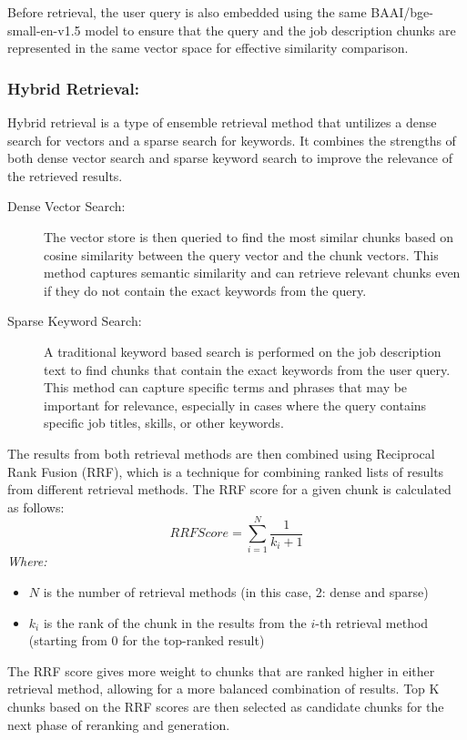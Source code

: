 ﻿\documentclass{article}
\renewcommand{\text}[1]{\mathit{#1}}
\begin{document}
Before retrieval, the user query is also embedded using the same BAAI/bge-small-en-v1.5 model to ensure that the query and the job description chunks are represented in the same vector space for effective similarity comparison.

\subsubsection*{Hybrid Retrieval:}

Hybrid retrieval is a type of ensemble retrieval method that untilizes a dense search for vectors and a sparse search for keywords.
It combines the strengths of both dense vector search and sparse keyword search to improve the relevance of the retrieved results.

\begin{description}
	\item[Dense Vector Search:] The vector store is then queried to find the most similar chunks based on cosine similarity between the query vector and the chunk vectors. This method captures semantic similarity and can retrieve relevant chunks even if they do not contain the exact keywords from the query. 
	\item[Sparse Keyword Search:] A traditional keyword based search is performed on the job description text to find chunks that contain the exact keywords from the user query. This method can capture specific terms and phrases that may be important for relevance, especially in cases where the query contains specific job titles, skills, or other keywords.
\end{description}

The results from both retrieval methods are then combined using Reciprocal Rank Fusion (RRF), which is a technique for combining ranked lists of results from different retrieval methods.
The RRF score for a given chunk is calculated as follows:
\begin{equation}
\text{RRF Score} = \sum_{i=1}^{N} \frac{1}{k_i + 1}
\end{equation}
\textit{Where: \\}
\begin{itemize}
	\item $N$ is the number of retrieval methods (in this case, 2: dense and sparse)
	\item $k_i$ is the rank of the chunk in the results from the $i$-th retrieval method (starting from 0 for the top-ranked result)
\end{itemize}
The RRF score gives more weight to chunks that are ranked higher in either retrieval method, allowing for a more balanced combination of results.
Top K chunks based on the RRF scores are then selected as candidate chunks for the next phase of reranking and generation.
\end{document}
